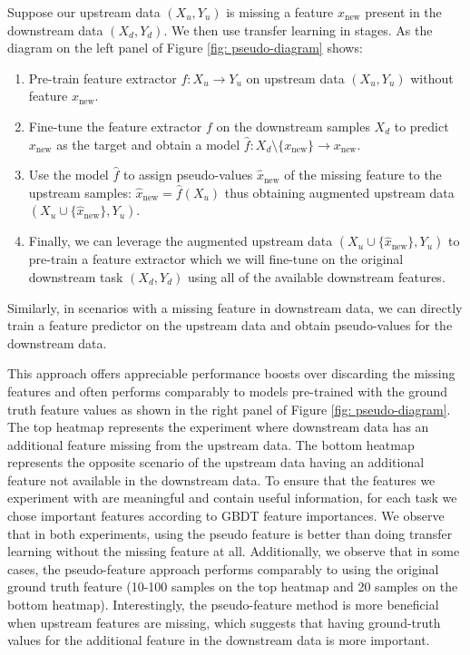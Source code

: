 Suppose our upstream data $(X_u, Y_u)$ is missing a feature $x_{\text{new}}$ present in the downstream data $(X_d, Y_d)$. We then use transfer learning in stages. As the diagram on the left panel of Figure \ref{fig: pseudo-diagram} shows:

\begin{enumerate}
    \item Pre-train feature extractor $f: X_u \to Y_u$ on upstream data $(X_u, Y_u)$ without feature $x_{\text{new}}$.
    \item Fine-tune the feature extractor $f$ on the downstream samples $X_d$ to predict $x_{\text{new}}$ as the target and obtain a model $\hat{f}: X_d \setminus \{x_{\text{new}}\} \to x_{\text{new}}$.
    \item Use the model $\hat{f}$ to assign pseudo-values $\hat{x}_{\text{new}}$ of the missing feature to the upstream samples: $\hat{x}_{\text{new}} = \hat{f}(X_u)$ thus obtaining augmented upstream data $(X_u\cup\{\hat{x}_{\text{new}}\}, Y_u)$.
    \item Finally, we can leverage the augmented upstream data $(X_u\cup\{\hat{x}_{\text{new}}\}, Y_u)$ to pre-train a feature extractor which we will fine-tune on the original downstream task $(X_d, Y_d)$ using all of the available downstream features. 
\end{enumerate}

Similarly, in scenarios with a missing feature in downstream data, we can directly train a feature predictor on the upstream data and obtain pseudo-values for the downstream data. 

This approach offers appreciable performance boosts over discarding the missing features and often performs comparably to models pre-trained with the ground truth feature values as shown in the right panel of Figure \ref{fig: pseudo-diagram}. The top heatmap represents the experiment where downstream data has an additional feature missing from the upstream data. The bottom heatmap represents the opposite scenario of the upstream data having an additional feature not available in the downstream data. To ensure that the features we experiment with are meaningful and contain useful information, for each task we chose important features according to GBDT feature importances. We observe that in both experiments, using the pseudo feature is better than doing transfer learning without the missing feature at all. Additionally, we observe that in some cases, the pseudo-feature approach performs comparably to using the original ground truth feature (10-100 samples on the top heatmap and 20 samples on the bottom heatmap). Interestingly, the pseudo-feature method is more beneficial when upstream features are missing, which suggests that having ground-truth values for the additional feature in the downstream data is more important. 

